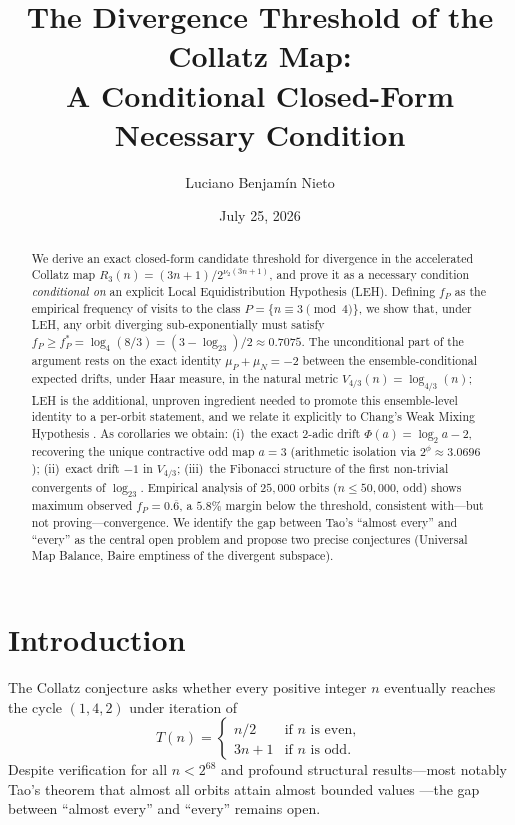 \documentclass[12pt,reqno]{amsart}
\title[The Divergence Threshold of the Collatz Map]{%
The Divergence Threshold of the Collatz Map:\\
A Conditional Closed-Form Necessary Condition%
}
\author{Luciano Benjam\'{i}n Nieto}
\date{July 25, 2026}
\theoremstyle{plain}
\theoremstyle{definition}
\newcommand{\logtwo}{\log_2}
\newcommand{\logfour}{\log_4}
\newcommand{\fP}{f_P}
\newcommand{\fPstar}{f_P^*}
\newcommand{\muP}{\mu_P}
\newcommand{\muN}{\mu_N}
\newcommand{\PhiDrift}{\Phi}
\newcommand{\Vmetric}{V_{4/3}}
\begin{document}
\begin{abstract}
We derive an exact closed-form candidate threshold for divergence in the accelerated
Collatz map $R_3(n) = (3n+1)/2^{\nu_2(3n+1)}$, and prove it as a necessary condition
\emph{conditional on} an explicit Local Equidistribution Hypothesis (LEH).
Defining $\fP$ as the empirical frequency of visits to the class $P = \{n \equiv 3 \pmod{4}\}$,
we show that, under LEH, any orbit diverging sub-exponentially must satisfy
$\fP \geq \fPstar = \logfour(8/3) = (3 - \logtwo 3)/2 \approx 0.7075$.
The unconditional part of the argument rests on the exact identity $\muP + \muN = -2$
between the ensemble-conditional expected drifts, under Haar measure, in the natural
metric $\Vmetric(n) = \log_{4/3}(n)$; LEH is the additional, unproven ingredient needed
to promote this ensemble-level identity to a per-orbit statement, and we relate it
explicitly to Chang's Weak Mixing Hypothesis \cite{chang2026paradigm}.
As corollaries we obtain:
\textup{(i)}~the exact $2$-adic drift $\PhiDrift(a) = \logtwo a - 2$,
recovering the unique contractive odd map $a=3$
(arithmetic isolation via $2^\phi \approx 3.0696$);
\textup{(ii)}~exact drift $-1$ in $\Vmetric$;
\textup{(iii)}~the Fibonacci structure of the first non-trivial convergents of $\logtwo 3$.
Empirical analysis of $25{,}000$ orbits ($n \leq 50{,}000$, odd) shows
maximum observed $\fP = 0.\overline{6}$, a $5.8\%$ margin below the threshold,
consistent with---but not proving---convergence.
We identify the gap between Tao's ``almost every'' \cite{tao2019} and ``every''
as the central open problem and propose two precise conjectures
(Universal Map Balance, Baire emptiness of the divergent subspace).
\end{abstract}

\maketitle

\section{Introduction}\label{sec:intro}

The Collatz conjecture asks whether every positive integer $n$ eventually reaches
the cycle $(1,4,2)$ under iteration of
\begin{equation}\label{eq:collatz}
T(n) = \begin{cases}
n/2 & \text{if } n \text{ is even},\\
3n+1 & \text{if } n \text{ is odd}.
\end{cases}
\end{equation}
Despite verification for all $n < 2^{68}$ \cite{lagarias2010} and
profound structural results---most notably Tao's theorem that almost all orbits
attain almost bounded values \cite{tao2019}---the gap between ``almost every''
and ``every'' remains open.
\end{document}

